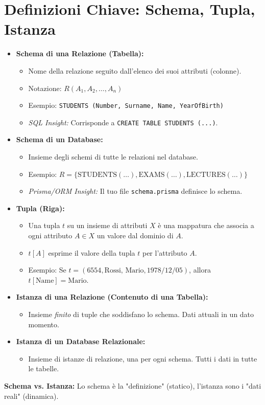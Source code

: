 	\section{Definizioni Chiave: Schema, Tupla, Istanza}
	\begin{itemize}
		\item \textbf{Schema di una Relazione (Tabella):}
		\begin{itemize}
			\item Nome della relazione seguito dall'elenco dei suoi attributi (colonne).
			\item Notazione: $R(A_1, A_2, \dots, A_n)$
			\item Esempio: \texttt{STUDENTS (Number, Surname, Name, YearOfBirth)}
			\item \textit{SQL Insight:} Corrisponde a \texttt{CREATE TABLE STUDENTS (...)}.
		\end{itemize}
		\item \textbf{Schema di un Database:}
		\begin{itemize}
			\item Insieme degli schemi di tutte le relazioni nel database.
			\item Esempio: $R = \{\text{STUDENTS}(\dots), \text{EXAMS}(\dots), \text{LECTURES}(\dots)\}$
			\item \textit{Prisma/ORM Insight:} Il tuo file \texttt{schema.prisma} definisce lo schema.
		\end{itemize}
		\item \textbf{Tupla (Riga):}
		\begin{itemize}
			\item Una tupla $t$ su un insieme di attributi $X$ è una mappatura che associa a ogni attributo $A \in X$ un valore dal dominio di $A$.
			\item $t[A]$ esprime il valore della tupla $t$ per l'attributo $A$.
			\item Esempio: Se $t = (6554, \text{Rossi, Mario}, 1978/12/05)$, allora $t[\text{Name}] = \text{Mario}$.
		\end{itemize}
		\item \textbf{Istanza di una Relazione (Contenuto di una Tabella):}
		\begin{itemize}
			\item Insieme \textit{finito} di tuple che soddisfano lo schema. Dati attuali in un dato momento.
		\end{itemize}
		\item \textbf{Istanza di un Database Relazionale:}
		\begin{itemize}
			\item Insieme di istanze di relazione, una per ogni schema. Tutti i dati in tutte le tabelle.
		\end{itemize}
	\end{itemize}
	\textbf{Schema vs. Istanza:} Lo schema è la "definizione" (statico), l'istanza sono i "dati reali" (dinamica).
	
